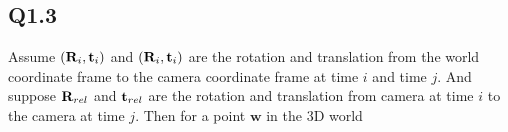 \documentclass[11pt]{article}
\begin{document}
%
%
%

\newpage

\subsection*{Q1.3}

\newcommand{\pointw}{\mathbf{w}}

Assume $(\mathbf{R}_i, \mathbf{t}_i)$ and $(\mathbf{R}_i, \mathbf{t}_i)$ are the rotation and translation from the world coordinate frame to the camera coordinate frame at time $i$ and time $j$. And suppose $\mathbf{R}_{rel}$ and $\mathbf{t}_{rel}$ are the rotation and translation from camera at time $i$ to the camera at time $j$. Then for a point $\pointw$ in the 3D world
\end{document}
